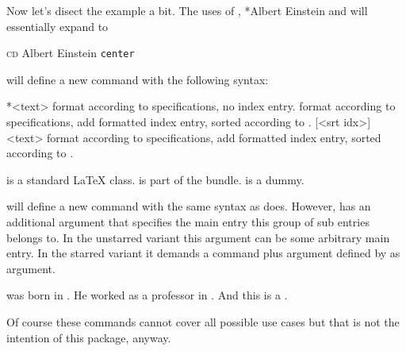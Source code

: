 \documentclass{cnpkgdoc}
\begin{document}
Now let's disect the example a bit. The uses of ,
*{Albert Einstein} and  will essentially expand
to
\begin{beispiel}
 \textsc{cd}
 \textsf{Albert Einstein}
 \texttt{center}
\end{beispiel}

 will define a new command with the following syntax:
\begin{beschreibung}
 *{<text>}\newline
   format  according to specifications, no index entry.
 \newline
   format  according to specifications, add formatted index entry,
   sorted according to .
 [<srt idx>]{<text>}\newline
   format  according to specifications, add formatted index entry,
   sorted according to .
\end{beschreibung}

\begin{beispiel}
  is a standard \LaTeX{} class.
  is part of the \KOMAScript{} bundle.
  is a dummy.
\end{beispiel}

 will define a new command with the same syntax as 
does. However,  has an additional argument that specifies the
main entry this group of sub entries belongs to. In the unstarred variant this
argument can be some arbitrary main entry. In the starred variant it demands
a command plus argument defined by  as argument.

\begin{beispiel}
  was born in . He worked as a professor in .
 And this is a .
\end{beispiel}

Of course these commands cannot cover all possible use cases but that is not the
intention of this package, anyway.
\end{document}

